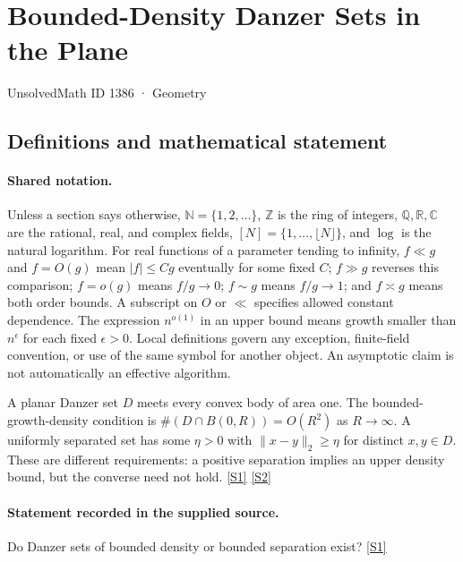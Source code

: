\documentclass[11pt,a4paper]{article}
\newcommand{\N}{\mathbb{N}}
\newcommand{\Z}{\mathbb{Z}}
\newcommand{\Q}{\mathbb{Q}}
\newcommand{\R}{\mathbb{R}}
\newcommand{\C}{\mathbb{C}}
\newcommand{\sref}[2]{\hyperlink{source:#1:#2}{[S#2]}}
\begin{document}

\setcounter{section}{1385}

\section{Bounded-Density Danzer Sets in the Plane}\label{1386}

{\small\sffamily UnsolvedMath ID 1386 · Geometry}

\subsection{Definitions and mathematical statement}

\paragraph{Shared notation.}Unless a section says otherwise, $\N=\{1,2,\ldots\}$,
$\Z$ is the ring of integers, $\Q,\R,\C$ are the rational, real, and complex
fields, $[N]=\{1,\ldots,\lfloor N\rfloor\}$, and $\log$ is the natural
logarithm. For real functions of a parameter tending to infinity,
$f\ll g$ and $f=O(g)$ mean $|f|\leq Cg$ eventually for some fixed $C$;
$f\gg g$ reverses this comparison; $f=o(g)$ means $f/g\to0$;
$f\sim g$ means $f/g\to1$; and $f\asymp g$ means both order bounds.
A subscript on $O$ or $\ll$ specifies allowed constant dependence.
The expression $n^{o(1)}$ in an upper bound means growth smaller than
$n^\epsilon$ for each fixed $\epsilon>0$. Local definitions govern any
exception, finite-field convention, or use of the same symbol for another
object. An asymptotic claim is not automatically an effective algorithm.



A planar Danzer set $D$ meets every convex body of area one. The bounded-growth-density condition is $\#(D\cap B(0,R))=O(R^2)$ as $R\to\infty$. A uniformly separated set has some $\eta>0$ with $\|x-y\|_2\geq\eta$ for distinct $x,y\in D$. These are different requirements: a positive separation implies an upper density bound, but the converse need not hold. \sref{1386}{1} \sref{1386}{2}

\paragraph{Statement recorded in the supplied source.}
Do Danzer sets of bounded density or bounded separation exist? \sref{1386}{1}
\end{document}

